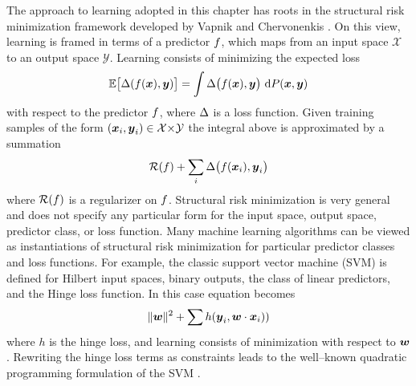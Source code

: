 \newcommand\inp{\vect{x}}
\newcommand\outp{\vect{y}}

The approach to learning adopted in this chapter has roots in the
structural risk minimization framework developed by Vapnik and
Chervonenkis \cite{Vapnik1998}. On this view, learning is framed in
terms of a predictor $\Predictor$, which maps from an input space
$\mathcal{X}$ to an output space $\mathcal{Y}$. Learning consists of
minimizing the expected loss
\begin{equation}
  \label{eq:expected-utility-maximization}
  \Expected\bigl[ \Loss(f(\inp),\outp) \bigr] 
  =
  \int \Loss\bigl(\Predictor(\inp),\outp\bigr) ~ \intd P(\inp,\outp)
\end{equation}
with respect to the predictor $\Predictor$, where $\Loss$ is a loss
function. Given training samples of the form
$(\inp_i,\outp_i)\in\mathcal{X}\cross\mathcal{Y}$ the integral above is
approximated by a summation
\begin{equation}
  \label{eq:srm}
  \mathcal{R}(\Predictor) + \sum_i \Loss\bigl(\Predictor(\inp_i),\outp_i\bigr)
\end{equation}
where $\mathcal{R}(\Predictor)$ is a regularizer on
$\Predictor$. Structural risk minimization is very general and does
not specify any particular form for the input space, output space,
predictor class, or loss function. Many machine learning algorithms
can be viewed as instantiations of structural risk minimization for
particular predictor classes and loss functions. For example, the
classic support vector machine (SVM) \cite{Cortes1995} is defined for
Hilbert input spaces, binary outputs, the class of linear predictors,
and the Hinge loss function. In this case equation 
becomes
\begin{equation}
  \|\Model\|^2 + \sum h(\outp_i, \Model \cdot \inp_i))
\end{equation}
where $h$ is the hinge loss, and learning consists of minimization
with respect to $\Model$. Rewriting the hinge loss terms as constraints leads
to the well--known quadratic programming formulation of the SVM
\cite{Cortes1995}.

